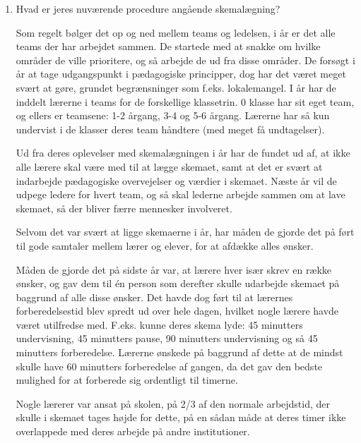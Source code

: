 \begin{enumerate}
	\item Hvad er jeres nuværende procedure angående skemalægning?

	Som regelt bølger det op og ned mellem teams og ledelsen, i år er det alle teams der har arbejdet sammen. De startede med at snakke om hvilke områder de ville prioritere, og så arbejde de ud fra disse områder. De forsøgt i år at tage udgangspunkt i pædagogiske principper, dog har det været meget svært at gøre, grundet begrænsninger som f.eks. lokalemangel. I år har de inddelt lærerne i teams for de forskellige klassetrin. 0 klasse har sit eget team, og ellers er teamsene: 1-2 årgang, 3-4 og 5-6 årgang. Lærerne har så kun undervist i de klasser deres team håndtere (med meget få undtagelser).

	Ud fra deres oplevelser med skemalægningen i år har de fundet ud af, at ikke alle lærere skal være med til at lægge skemaet, samt at det er svært at indarbejde pædagogiske overvejelser og værdier i skemaet. Næste år vil de udpege ledere for hvert team, og så skal lederne arbejde sammen om at lave skemaet, så der bliver færre mennesker involveret.

	Selvom det var svært at ligge skemaerne i år, har måden de gjorde det på ført til gode samtaler mellem lærer og elever, for at afdække alles ønsker.

	Måden de gjorde det på sidste år var, at lærere hver især skrev en række ønsker, og gav dem til \'en person som derefter skulle udarbejde skemaet på baggrund af alle disse ønsker. Det havde dog ført til at lærernes forberedelsestid blev spredt ud over hele dagen, hvilket nogle lærere havde været utilfredse med. F.eks. kunne deres skema lyde: 45 minutters undervisning, 45 minutters pause, 90 minutters undervisning og så 45 minutters forberedelse. Lærerne ønskede på baggrund af dette at de mindst skulle have 60 minutters forberedelse af gangen, da det gav den bedste mulighed for at forberede sig ordentligt til timerne.

	Nogle lærerer var ansat på skolen, på 2/3 af den normale arbejdstid, der skulle i skemaet tages højde for dette, på en sådan måde at deres timer ikke overlappede med deres arbejde på andre institutioner.

\noindent\makebox[\linewidth]{\rule{\paperwidth}{0.4pt}}


\end{enumerate}
